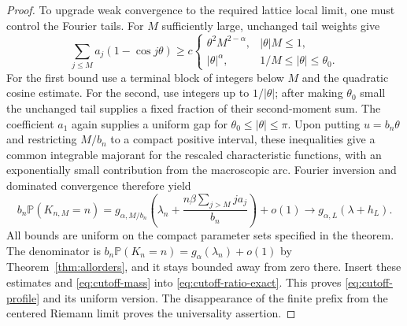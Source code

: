 \documentclass[11pt,a4paper]{article}
\numberwithin{equation}{section}
\theoremstyle{definition}
\theoremstyle{remark}
\newcommand{\Prob}{\mathbb P}
\begin{document}
\begin{proof}
To upgrade weak convergence to the required lattice local limit, one
must control the Fourier tails. For $M$ sufficiently large, unchanged
tail weights give
\begin{equation}\label{eq:trunc-fourier-bound}
 \sum_{j\le M}a_j(1-\cos j\theta)\ge c
 \begin{cases}
 \theta^2M^{2-\alpha},&|\theta|M\le1,\\
 |\theta|^\alpha,&1/M\le|\theta|\le\theta_0.
 \end{cases}
\end{equation}
For the first bound use a terminal block of integers below $M$ and the
quadratic cosine estimate. For the second, use integers up to
$1/|\theta|$; after making $\theta_0$ small the unchanged tail supplies
a fixed fraction of their second-moment sum. The coefficient $a_1$
again supplies a uniform gap for $\theta_0\le|\theta|\le\pi$.
Upon putting $u=b_n\theta$ and restricting $M/b_n$ to a compact
positive interval, these inequalities give a common integrable
majorant for the rescaled characteristic functions, with an
exponentially small contribution from the macroscopic arc.
Fourier inversion and dominated convergence therefore yield
\[
 b_n\Prob(K_{n,M}=n)
   =g_{\alpha,M/b_n}\left(\lambda_n+
                   \frac{n\beta\sum_{j>M}j a_j}{b_n}\right)+o(1)
   \longrightarrow g_{\alpha,L}(\lambda+h_L).
\]
All bounds are uniform on the compact parameter sets specified in the
theorem. The denominator is
$b_n\Prob(K_n=n)=g_\alpha(\lambda_n)+o(1)$ by
Theorem~\ref{thm:allorders}, and it stays bounded away from zero there.
Insert these estimates and \eqref{eq:cutoff-mass} into
\eqref{eq:cutoff-ratio-exact}. This proves \eqref{eq:cutoff-profile} and
its uniform version. The disappearance of the finite prefix from the
centered Riemann limit proves the universality assertion.
\end{proof}
\end{document}
